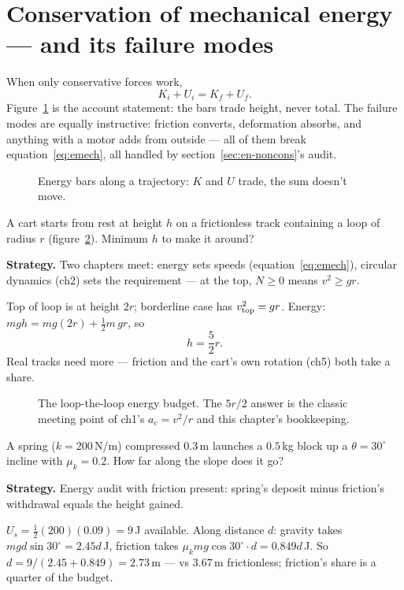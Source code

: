 \section{Conservation of mechanical energy --- and its failure modes}\label{sec:en-cons}

When only conservative forces work,
\begin{equation}
  K_i+U_i=K_f+U_f.\label{eq:emech}
\end{equation}
Figure~\ref{fig:bars} is the account statement: the bars trade height,
never total. The failure modes are equally instructive: friction converts,
deformation absorbs, and anything with a motor adds from outside --- all
of them break equation~\eqref{eq:emech}, all handled by
section~\ref{sec:en-noncons}'s audit.

\begin{figure}[htbp]\centering

\caption{Energy bars along a trajectory: $K$ and $U$ trade, the sum
doesn't move.}
\label{fig:bars}
\end{figure}

\begin{example}\label{ex:loop}
A cart starts from rest at height $h$ on a frictionless track containing a
loop of radius $r$ (figure~\ref{fig:loop}). Minimum $h$ to make it
around?
\par\smallskip
\textbf{Strategy.} Two chapters meet: energy sets speeds
(equation~\eqref{eq:emech}), circular dynamics (ch2) sets the requirement
--- at the top, $N\ge0$ means $v^{2}\ge gr$.
\begin{solution}
Top of loop is at height $2r$; borderline case has $v_{\rm top}^{2}=gr$.
Energy: $mgh=mg(2r)+\tfrac12m\,gr$, so
\[
  h=\frac{5}{2}r.
\]
Real tracks need more --- friction and the cart's own rotation (ch5) both
take a share. \checkmark
\end{solution}
\end{example}

\begin{figure}[htbp]\centering

\caption{The loop-the-loop energy budget. The $5r/2$ answer is the
classic meeting point of ch1's $a_c=v^{2}/r$ and this chapter's
bookkeeping.}
\label{fig:loop}
\end{figure}

\begin{example}\label{ex:springincl}
A spring ($k=200$\,N/m) compressed $0.3$\,m launches a $0.5$\,kg block up
a $\theta=30^{\circ}$ incline with $\mu_k=0.2$. How far along the slope
does it go?
\par\smallskip
\textbf{Strategy.} Energy audit with friction present: spring's deposit
minus friction's withdrawal equals the height gained.
\begin{solution}
$U_s=\tfrac12(200)(0.09)=9$\,J available. Along distance $d$: gravity
takes $mgd\sin30^{\circ}=2.45d$\,J, friction takes
$\mu_k mg\cos30^{\circ}\cdot d=0.849d$\,J. So
$d=9/(2.45+0.849)=2.73$\,m --- vs $3.67$\,m frictionless; friction's
share is a quarter of the budget. \checkmark
\end{solution}
\end{example}

